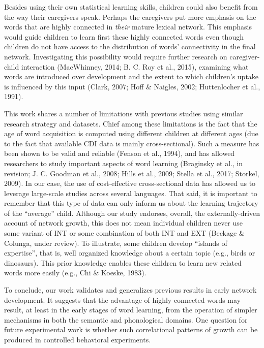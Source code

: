 \documentclass[english,floatsintext,man]{apa6}
\theoremstyle{definition}
\theoremstyle{definition}
\theoremstyle{definition}
\theoremstyle{remark}
\begin{document}
Besides using their own statistical learning skills, children could also
benefit from the way their caregivers speak. Perhaps the caregivers put
more emphasis on the words that are highly connected in \emph{their}
mature lexical network. This emphasis would guide children to learn
first these highly connected words even though children do not have
access to the distribution of words' connectivity in the final network.
Investigating this possibility would require further research on
caregiver-child interaction (MacWhinney, 2014; B. C. Roy et al., 2015),
examining what words are introduced over development and the extent to
which children's uptake is influenced by this input (Clark, 2007; Hoff
\& Naigles, 2002; Huttenlocher et al., 1991).

This work shares a number of limitations with previous studies using
similar research strategy and datasets. Chief among these limitations is
the fact that the age of word acquisition is computed using different
children at different ages (due to the fact that available CDI data is
mainly cross-sectional). Such a measure has been shown to be valid and
reliable (Fenson et al., 1994), and has allowed researchers to study
important aspects of word learning (Braginsky et al., in revision; J. C.
Goodman et al., 2008; Hills et al., 2009; Stella et al., 2017; Storkel,
2009). In our case, the use of cost-effective cross-sectional data has
allowed us to leverage large-scale studies across several languages.
That said, it is important to remember that this type of data can only
inform us about the learning trajectory of the \enquote{average} child.
Although our study endorses, overall, the externally-driven account of
network growth, this does not mean individual children never use some
variant of INT or some combination of both INT and EXT (Beckage \&
Colunga, under review). To illustrate, some children develop
\enquote{islands of expertise}, that is, well organized knowledge about
a certain topic (e.g., birds or dinosaurs). This prior knowledge enables
these children to learn new related words more easily (e.g., Chi \&
Koeske, 1983).

To conclude, our work validates and generalizes previous results in
early network development. It suggests that the advantage of highly
connected words may result, at least in the early stages of word
learning, from the operation of simpler mechanisms in both the semantic
and phonological domains. One question for future experimental work is
whether such correlational patterns of growth can be produced in
controlled behavioral experiments.
\end{document}
